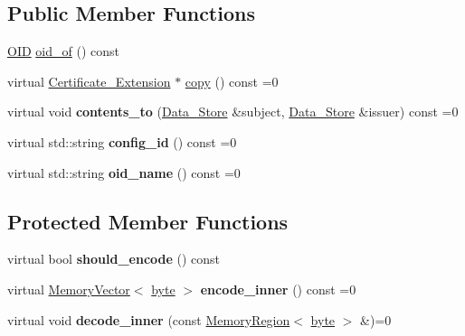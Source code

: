 \subsection*{Public Member Functions}
\begin{DoxyCompactItemize}
\item 
\hyperlink{classBotan_1_1OID}{O\-I\-D} \hyperlink{classBotan_1_1Certificate__Extension_a925ac5d925faaffd36e51db0dc2149c2}{oid\-\_\-of} () const 
\item 
virtual \hyperlink{classBotan_1_1Certificate__Extension}{Certificate\-\_\-\-Extension} $\ast$ \hyperlink{classBotan_1_1Certificate__Extension_aacee2a5db40912dc14caab7f002a2af9}{copy} () const =0
\item 
\hypertarget{classBotan_1_1Certificate__Extension_a203981f82b8b986905a48dea9097dbc7}{virtual void {\bfseries contents\-\_\-to} (\hyperlink{classBotan_1_1Data__Store}{Data\-\_\-\-Store} \&subject, \hyperlink{classBotan_1_1Data__Store}{Data\-\_\-\-Store} \&issuer) const =0}\label{classBotan_1_1Certificate__Extension_a203981f82b8b986905a48dea9097dbc7}

\item 
\hypertarget{classBotan_1_1Certificate__Extension_aff6fb98502a2637cf107922105c59fa7}{virtual std\-::string {\bfseries config\-\_\-id} () const =0}\label{classBotan_1_1Certificate__Extension_aff6fb98502a2637cf107922105c59fa7}

\item 
\hypertarget{classBotan_1_1Certificate__Extension_a402e8213225db836b23f741f7fd77eaf}{virtual std\-::string {\bfseries oid\-\_\-name} () const =0}\label{classBotan_1_1Certificate__Extension_a402e8213225db836b23f741f7fd77eaf}

\end{DoxyCompactItemize}
\subsection*{Protected Member Functions}
\begin{DoxyCompactItemize}
\item 
\hypertarget{classBotan_1_1Certificate__Extension_abb93ed0bdc274969440a967b368a78f1}{virtual bool {\bfseries should\-\_\-encode} () const }\label{classBotan_1_1Certificate__Extension_abb93ed0bdc274969440a967b368a78f1}

\item 
\hypertarget{classBotan_1_1Certificate__Extension_aa5607855c94a839d493e516188f75580}{virtual \hyperlink{classBotan_1_1MemoryVector}{Memory\-Vector}$<$ \hyperlink{namespaceBotan_a7d793989d801281df48c6b19616b8b84}{byte} $>$ {\bfseries encode\-\_\-inner} () const =0}\label{classBotan_1_1Certificate__Extension_aa5607855c94a839d493e516188f75580}

\item 
\hypertarget{classBotan_1_1Certificate__Extension_a2bc8aaf0dcc690247a43855d9b1cac98}{virtual void {\bfseries decode\-\_\-inner} (const \hyperlink{classBotan_1_1MemoryRegion}{Memory\-Region}$<$ \hyperlink{namespaceBotan_a7d793989d801281df48c6b19616b8b84}{byte} $>$ \&)=0}\label{classBotan_1_1Certificate__Extension_a2bc8aaf0dcc690247a43855d9b1cac98}

\end{DoxyCompactItemize}
